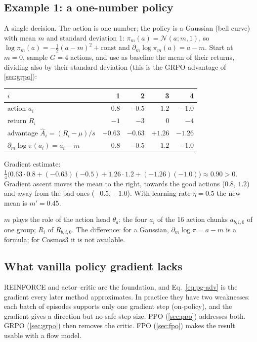 \documentclass[11pt,a4paper]{article}
\newcommand{\N}{\mathcal{N}}
\newcommand{\Ah}{\hat A}
\begin{document}
\subsection{Example 1: a one-number policy}\label{sec:ex1}
A single decision. The action is one number; the policy is a Gaussian (bell curve) with mean $m$ and standard deviation 1: $\pi_m(a)=\N(a;m,1)$, so $\log\pi_m(a)=-\tfrac12(a-m)^2+\text{const}$ and $\partial_m\log\pi_m(a)=a-m$. Start at $m=0$, sample $G=4$ actions, and use as baseline the mean of their returns, dividing also by their standard deviation (this is the GRPO advantage of \cref{sec:grpo}):
\begin{center}
\small
\begin{tabular}{@{}lrrrr@{}}
\toprule
$i$ & 1 & 2 & 3 & 4\\
\midrule
action $a_i$ & $0.8$ & $-0.5$ & $1.2$ & $-1.0$\\
return $R_i$ & $-1$ & $-3$ & $0$ & $-4$\\
advantage $\Ah_i=(R_i-\mu)/s$ & $+0.63$ & $-0.63$ & $+1.26$ & $-1.26$\\
$\partial_m\log\pi(a_i)=a_i-m$ & $0.8$ & $-0.5$ & $1.2$ & $-1.0$\\
\bottomrule
\end{tabular}
\end{center}
Gradient estimate: $\tfrac14\big(0.63\cdot0.8+(-0.63)(-0.5)+1.26\cdot1.2+(-1.26)(-1.0)\big)\approx0.90>0$. Gradient ascent moves the mean to the right, towards the good actions ($0.8$, $1.2$) and away from the bad ones ($-0.5$, $-1.0$). With learning rate $\eta=0.5$ the new mean is $m'=0.45$.
\begin{paperlink}
$m$ plays the role of the action head $\theta_a$; the four $a_i$ of the 16 action chunks $a_{b,i,0}$ of one group; $R_i$ of $R_{b,i,0}$. The difference: for a Gaussian, $\partial_m\log\pi=a-m$ is a formula; for Cosmos3 it is not available.
\end{paperlink}

\subsection{What vanilla policy gradient lacks}
REINFORCE and actor--critic are the foundation, and Eq.~\eqref{eq:pg-adv} is the gradient every later method approximates. In practice they have two weaknesses: each batch of episodes supports only one gradient step (on-policy), and the gradient gives a direction but no safe step size. PPO (\cref{sec:ppo}) addresses both. GRPO (\cref{sec:grpo}) then removes the critic. FPO (\cref{sec:fpo}) makes the result usable with a flow model.
\end{document}
